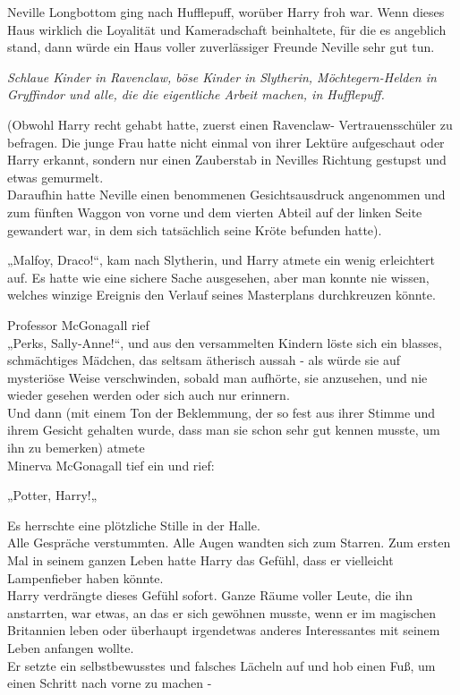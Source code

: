 {Neville Longbottom ging nach Hufflepuff, worüber Harry froh war. Wenn dieses Haus wirklich die Loyalität und Kameradschaft beinhaltete, für die es angeblich stand, dann würde ein Haus voller zuverlässiger Freunde Neville sehr gut tun.

\emph{Schlaue Kinder in Ravenclaw, böse Kinder in Slytherin, Möchtegern-Helden in Gryffindor und alle, die die eigentliche Arbeit machen, in Hufflepuff.}

(Obwohl Harry recht gehabt hatte, zuerst einen Ravenclaw- Vertrauensschüler zu befragen. Die junge Frau hatte nicht einmal von ihrer Lektüre aufgeschaut oder Harry erkannt, sondern nur einen Zauberstab in Nevilles Richtung gestupst und etwas gemurmelt.\\ Daraufhin hatte Neville einen benommenen Gesichtsausdruck angenommen und zum fünften Waggon von vorne und dem vierten Abteil auf der linken Seite gewandert war, in dem sich tatsächlich seine Kröte befunden hatte).

„Malfoy, Draco!“, kam nach Slytherin, und Harry atmete ein wenig erleichtert auf. Es hatte wie eine sichere Sache ausgesehen, aber man konnte nie wissen, welches winzige Ereignis den Verlauf seines Masterplans durchkreuzen könnte.

Professor McGonagall rief\\ „Perks, Sally-Anne!“, und aus den versammelten Kindern löste sich ein blasses, schmächtiges Mädchen, das seltsam ätherisch aussah - als würde sie auf mysteriöse Weise verschwinden, sobald man aufhörte, sie anzusehen, und nie wieder gesehen werden oder sich auch nur erinnern.\\ Und dann (mit einem Ton der Beklemmung, der so fest aus ihrer Stimme und ihrem Gesicht gehalten wurde, dass man sie schon sehr gut kennen musste, um ihn zu bemerken) atmete\\ Minerva McGonagall tief ein und rief:

„Potter, Harry!„

Es herrschte eine plötzliche Stille in der Halle.\\ Alle Gespräche verstummten. Alle Augen wandten sich zum Starren. Zum ersten Mal in seinem ganzen Leben hatte Harry das Gefühl, dass er vielleicht Lampenfieber haben könnte.\\ Harry verdrängte dieses Gefühl sofort. Ganze Räume voller Leute, die ihn anstarrten, war etwas, an das er sich gewöhnen musste, wenn er im magischen Britannien leben oder überhaupt irgendetwas anderes Interessantes mit seinem Leben anfangen wollte.\\ Er setzte ein selbstbewusstes und falsches Lächeln auf und hob einen Fuß, um einen Schritt nach vorne zu machen -

}
